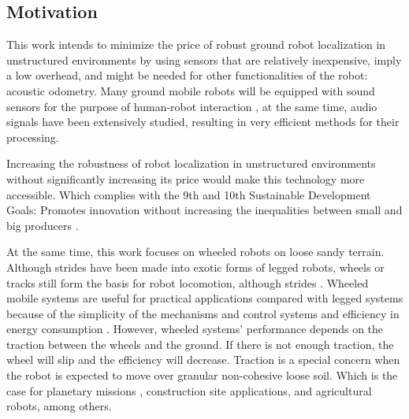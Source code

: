 \subsection{Motivation} \label{subsec:motivation}

This work intends to minimize the price of robust ground robot localization in
unstructured environments by using sensors that are relatively inexpensive,
imply a low overhead, and might be needed for other functionalities of the
robot: acoustic odometry. Many ground mobile robots will be equipped with sound
sensors for the purpose of human-robot interaction \cite{VoiceForklift}, at the
same time, audio signals have been extensively studied, resulting in very
efficient methods for their processing.

Increasing the robustness of robot localization in unstructured environments
without significantly increasing its price would make this technology more
accessible. Which complies with the 9th and 10th Sustainable Development Goals:
Promotes innovation without increasing the inequalities between small and big
producers \cite{SDG}.

At the same time, this work focuses on wheeled robots on loose sandy terrain.
Although strides have been made into exotic forms of legged robots, wheels or
tracks still form the basis for robot locomotion, although strides
\cite{Sanchez09}. Wheeled mobile systems are useful for practical applications
compared with legged systems because of the simplicity of the mechanisms and
control systems and efficiency in energy consumption \cite{Masayoshi2006}.
However, wheeled systems' performance depends on the traction between the
wheels and the ground. If there is not enough traction, the wheel will slip and
the efficiency will decrease. Traction is a special concern when the robot is
expected to move over granular non-cohesive loose soil. Which is the case for
planetary missions \cite{Amar2007}, construction site applications, and
agricultural robots, among others.